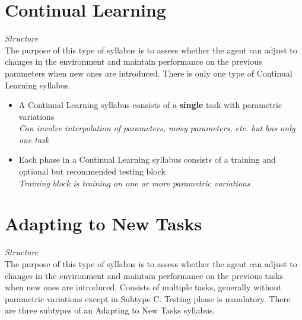 \section{Continual Learning}
\textit{Structure}\\[0.1in]

The purpose of this type of syllabus is to assess whether the agent can adjust to changes in the environment and maintain performance on the previous parameters when new ones are introduced. There is only one type of Continual Learning syllabus.

\begin{itemize}
\item A Continual Learning syllabus consists of a \textbf{single} task with parametric variations\\
\textit{Can involve interpolation of parameters, noisy parameters, etc. but has only one task \\}


\item Each phase in a Continual Learning syllabus consists of a training and optional but recommended testing block\\
\textit{Training block is training on one or more parametric variations}\\[0.1in]
\end{itemize}

\section{Adapting to New Tasks}
\textit{Structure}\\[0.1in]

The purpose of this type of syllabus is to assess whether the agent can adjust to changes in the environment and maintain performance on the previous tasks when new ones are introduced. Consists of multiple tasks, generally without parametric variations except in Subtype C. Testing phase is mandatory. There are three subtypes of an Adapting to New Tasks syllabus.

